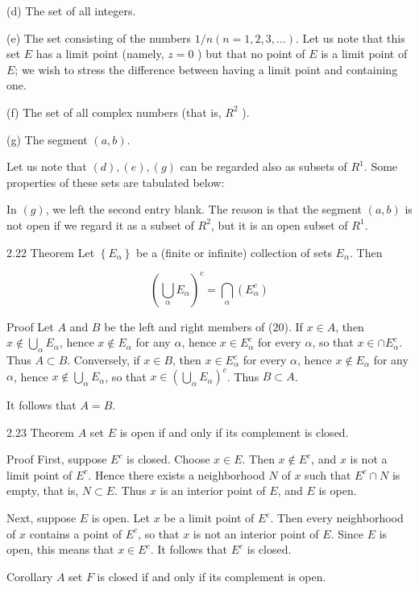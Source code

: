 \documentclass[10pt]{article}
\begin{document}
(d) The set of all integers.

(e) The set consisting of the numbers $1 / n(n=1,2,3, \ldots)$. Let us note that this set $E$ has a limit point (namely, $z=0$ ) but that no point of $E$ is a limit point of $E$; we wish to stress the difference between having a limit point and containing one.

(f) The set of all complex numbers (that is, $R^{2}$ ).

(g) The segment $(a, b)$.

Let us note that $(d),(e),(g)$ can be regarded also as subsets of $R^{1}$. Some properties of these sets are tabulated below:

In $(g)$, we left the second entry blank. The reason is that the segment $(a, b)$ is not open if we regard it as a subset of $R^{2}$, but it is an open subset of $R^{1}$.

2.22 Theorem Let $\left\{E_{\alpha}\right\}$ be a (finite or infinite) collection of sets $E_{\alpha}$. Then

$$
\left(\bigcup_{\alpha} E_{\alpha}\right)^{c}=\bigcap_{\alpha}\left(E_{\alpha}^{c}\right)
$$

Proof Let $A$ and $B$ be the left and right members of (20). If $x \in A$, then $x \notin \bigcup_{\alpha} E_{\alpha}$, hence $x \notin E_{\alpha}$ for any $\alpha$, hence $x \in E_{\alpha}^{c}$ for every $\alpha$, so that $x \in \cap E_{\alpha}^{c}$. Thus $A \subset B$. Conversely, if $x \in B$, then $x \in E_{\alpha}^{c}$ for every $\alpha$, hence $x \notin E_{\alpha}$ for any $\alpha$, hence $x \notin \bigcup_{\alpha} E_{\alpha}$, so that $x \in\left(\bigcup_{\alpha} E_{\alpha}\right)^{c}$. Thus $B \subset A$.

It follows that $A=B$.

2.23 Theorem $A$ set $E$ is open if and only if its complement is closed.

Proof First, suppose $E^{c}$ is closed. Choose $x \in E$. Then $x \notin E^{c}$, and $x$ is not a limit point of $E^{c}$. Hence there exists a neighborhood $N$ of $x$ such that $E^{c} \cap N$ is empty, that is, $N \subset E$. Thus $x$ is an interior point of $E$, and $E$ is open.

Next, suppose $E$ is open. Let $x$ be a limit point of $E^{c}$. Then every neighborhood of $x$ contains a point of $E^{c}$, so that $x$ is not an interior point of $E$. Since $E$ is open, this means that $x \in E^{c}$. It follows that $E^{c}$ is closed.

Corollary $A$ set $F$ is closed if and only if its complement is open.
\end{document}
